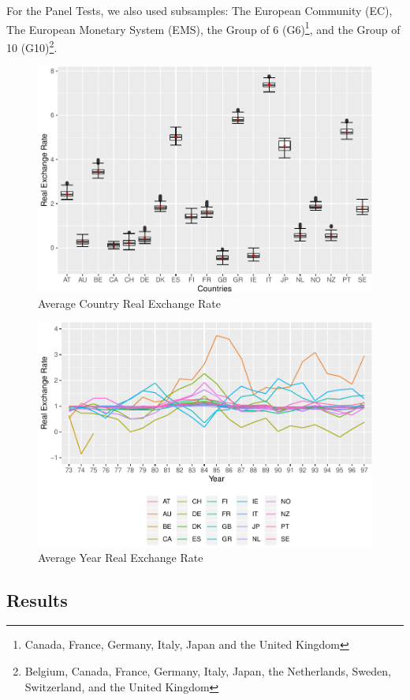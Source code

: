 \documentclass[]{article}
\begin{document}
For the Panel Tests, we also used subsamples: The European Community (EC), The European Monetary System (EMS), the Group of 6 (G6)\footnote{Canada, France, Germany, Italy, Japan and the United Kingdom}, and the Group of 10 (G10)\footnote{Belgium, Canada, France, Germany, Italy, Japan, the Netherlands, Sweden, Switzerland, and the United Kingdom}.

\begin{figure}

{\centering \includegraphics[width=0.75\linewidth]{Time_Series_v_pdf_files/figure-latex/rer1-1} 

}

\caption{Average Country Real Exchange Rate}\label{fig:rer1}
\end{figure}

\begin{figure}

{\centering \includegraphics[width=0.75\linewidth]{Time_Series_v_pdf_files/figure-latex/rer2-1} 

}

\caption{Average Year Real Exchange Rate}\label{fig:rer2}
\end{figure}

\hypertarget{results}{%
\subsection{Results}\label{results}}
\end{document}
